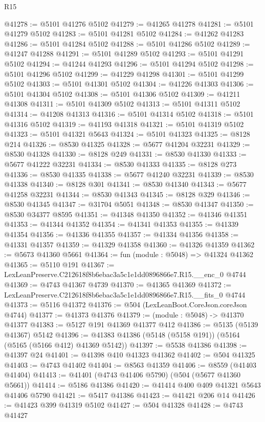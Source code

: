 \begin{lexlean}{R15}
\begin{coremodule}
{{{{{{{{{{{@41278 := @5101 @41276 @5102
@41279 := @41265 @41278
@41281 := @5101 @41279 @5102
@41283 := @5101 @41281 @5102
@41284 := @41262 @41283
@41286 := @5101 @41284 @5102
@41288 := @5101 @41286 @5102
@41289 := @41247 @41288
@41291 := @5101 @41289 @5102
@41293 := @5101 @41291 @5102
@41294 := @41244 @41293
@41296 := @5101 @41294 @5102
@41298 := @5101 @41296 @5102
@41299 := @41229 @41298
@41301 := @5101 @41299 @5102
@41303 := @5101 @41301 @5102
@41304 := @41226 @41303
@41306 := @5101 @41304 @5102
@41308 := @5101 @41306 @5102
@41309 := @41211 @41308
@41311 := @5101 @41309 @5102
@41313 := @5101 @41311 @5102
@41314 := @41208 @41313
@41316 := @5101 @41314 @5102
@41318 := @5101 @41316 @5102
@41319 := @41193 @41318
@41321 := @5101 @41319 @5102
@41323 := @5101 @41321 @5643
@41324 := @5101 @41323
@41325 := @8128 @214
@41326 := @8530 @41325
@41328 := @5677 @41204 @32231
@41329 := @8530 @41328
@41330 := @8128 @249
@41331 := @8530 @41330
@41333 := @5677 @41222 @32231
@41334 := @8530 @41333
@41335 := @8128 @273
@41336 := @8530 @41335
@41338 := @5677 @41240 @32231
@41339 := @8530 @41338
@41340 := @8128 @301
@41341 := @8530 @41340
@41343 := @5677 @41258 @32231
@41344 := @8530 @41343
@41345 := @8128 @329
@41346 := @8530 @41345
@41347 := @31704 @5051
@41348 := @8530 @41347
@41350 := @8530 @34377 @8595
@41351 := @41348 @41350
@41352 := @41346 @41351
@41353 := @41344 @41352
@41354 := @41341 @41353
@41355 := @41339 @41354
@41356 := @41336 @41355
@41357 := @41334 @41356
@41358 := @41331 @41357
@41359 := @41329 @41358
@41360 := @41326 @41359
@41362 := @5673 @41360 @5661
@41364 := fun (module : @5048) => @41324 @41362
@41365 := @5110 @191
@41367 := LexLeanPreserve.C212618f8b6ebac3a5c1e1dd0896866e7.R15.__enc_0 @4744
@41369 := @4743 @41367 @4739
@41370 := @41365 @41369
@41372 := LexLeanPreserve.C212618f8b6ebac3a5c1e1dd0896866e7.R15.__fits_0 @4744
@41373 := @5116 @41372
@41376 := @504 (LexLeanBoot.CoreJson.coreJson @4744)
@41377 := @41373 @41376
@41379 := (module : @5048) -> @41370 @41377
@41383 := @5127 @191 @41369 @41377 @412
@41386 := @5135 (@5139 @41367) @5142
@41396 := @41383 @41386 (@5148 (@5158 @191)) (@5164 (@5165 (@5166 @412) @41369 @5142))
@41397 := @5538 @41386
@41398 := @41397 @24
@41401 := @41398 @410 @41323 @41362
@41402 := @504 @41325
@41403 := @4743 @41402
@41404 := @8563 @41359
@41406 := @8559 (@41403 @41404)
@41413 := @41401 (@4743 @41406 @5790) (@504 (@5677 @41360 @5661))
@41414 := @5186 @41386
@41420 := @41414 @400 @409 @41321 @5643 @41406 @5790
@41421 := @5417 @41386
@41423 := @41421 @206 @14
@41426 := @41423 @399 @41319 @5102
@41427 := @504 @41328
@41428 := @4743 @41427
}}}}}}}}}}}
\end{coremodule}
\end{lexlean}
